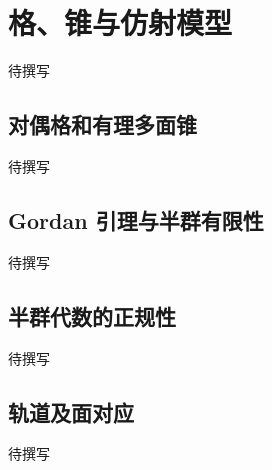 
% 
% 

\section{格、锥与仿射模型}
\label{g5:sec:2801}

待撰写

\subsection{对偶格和有理多面锥}
\label{g5:subsec:2801:01}
待撰写

\subsection{Gordan 引理与半群有限性}
\label{g5:subsec:2801:02}
待撰写

\subsection{半群代数的正规性}
\label{g5:subsec:2801:03}
待撰写

\subsection{轨道及面对应}
\label{g5:subsec:2801:04}
待撰写
